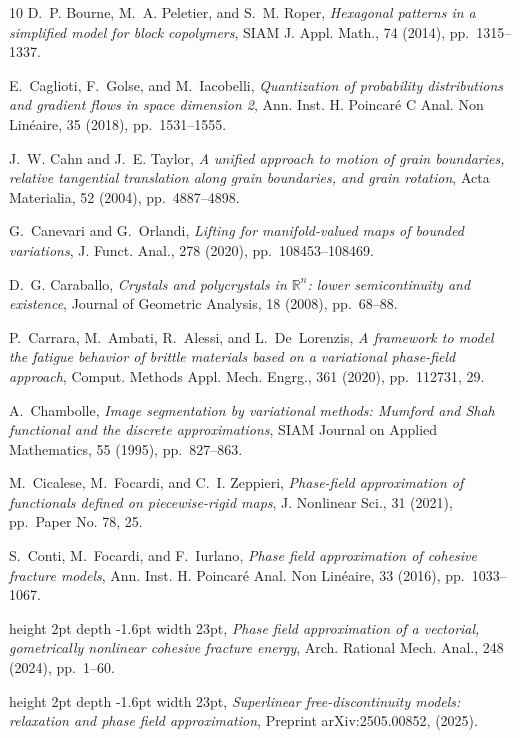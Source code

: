 \documentclass[a4paper,reqno]{amsart}
\newcommand\R{\mathbb{R}}
\theoremstyle{remark}
\numberwithin{equation}{section}
\begin{document}
\begin{thebibliography}{10}
{\sc D.~P. Bourne, M.~A. Peletier, and S.~M. Roper}, {\em Hexagonal patterns in
  a simplified model for block copolymers}, SIAM J. Appl. Math., 74 (2014),
  pp.~1315--1337.

{\sc E.~Caglioti, F.~Golse, and M.~Iacobelli}, {\em Quantization of probability
  distributions and gradient flows in space dimension 2}, Ann. Inst. H.
  Poincar\'e{} C Anal. Non Lin\'eaire, 35 (2018), pp.~1531--1555.

{\sc J.~W. Cahn and J.~E. Taylor}, {\em A unified approach to motion of grain
  boundaries, relative tangential translation along grain boundaries, and grain
  rotation}, Acta Materialia, 52 (2004), pp.~4887--4898.

{\sc G.~Canevari and G.~Orlandi}, {\em Lifting for manifold-valued maps of
  bounded variations}, J. Funct. Anal., 278 (2020), pp.~108453--108469.

{\sc D.~G. Caraballo}, {\em Crystals and polycrystals in {$\R^n$}: lower
  semicontinuity and existence}, Journal of Geometric Analysis, 18 (2008),
  pp.~68--88.

{\sc P.~Carrara, M.~Ambati, R.~Alessi, and L.~De~Lorenzis}, {\em A framework to
  model the fatigue behavior of brittle materials based on a variational
  phase-field approach}, Comput. Methods Appl. Mech. Engrg., 361 (2020),
  pp.~112731, 29.

{\sc A.~Chambolle}, {\em Image segmentation by variational methods: Mumford and
  {Shah} functional and the discrete approximations}, SIAM Journal on Applied
  Mathematics, 55 (1995), pp.~827--863.

{\sc M.~Cicalese, M.~Focardi, and C.~I. Zeppieri}, {\em Phase-field
  approximation of functionals defined on piecewise-rigid maps}, J. Nonlinear
  Sci., 31 (2021), pp.~Paper No. 78, 25.

{\sc S.~Conti, M.~Focardi, and F.~Iurlano}, {\em Phase field approximation of
  cohesive fracture models}, Ann. Inst. H. Poincar\'e Anal. Non Lin\'eaire, 33
  (2016), pp.~1033--1067.

\leavevmode\vrule height 2pt depth -1.6pt width 23pt, {\em Phase field
  approximation of a vectorial, gometrically nonlinear cohesive fracture
  energy}, Arch. Rational Mech. Anal., 248 (2024), pp.~1--60.

\leavevmode\vrule height 2pt depth -1.6pt width 23pt, {\em Superlinear
  free-discontinuity models: relaxation and phase field approximation},
  Preprint arXiv:2505.00852,  (2025).


\end{thebibliography}
\end{document}
